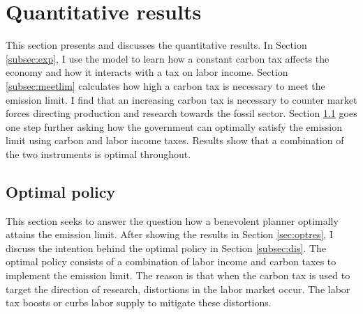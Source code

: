 \section{Quantitative results}\label{sec:res}

This section presents and discusses the quantitative results. 
In Section \ref{subsec:exp}, I use the model to learn how a constant carbon tax affects the economy and how it interacts with a tax on labor income. Section \ref{subsec:meetlim} calculates how high a carbon tax is necessary to meet the emission limit. I find that an increasing carbon tax is necessary to counter market forces directing production and research towards the fossil sector. 
Section \ref{subsec:mr} goes one step further asking  how the government can optimally satisfy the emission limit using carbon and labor income taxes. Results show that a combination of the two instruments is optimal throughout. 




\subsection{Optimal policy}\label{subsec:mr}


This section seeks to answer the question how a benevolent planner optimally attains the emission limit. After showing the results in Section \ref{sec:optres}, I discuss the intention behind the optimal policy in Section \ref{subsec:dis}. The optimal policy consists of a combination of labor income and carbon taxes to implement the emission limit. The reason is that when the carbon tax is used to target the direction of research, distortions in the labor market occur. The labor tax boosts or curbs labor supply to mitigate these distortions. 

